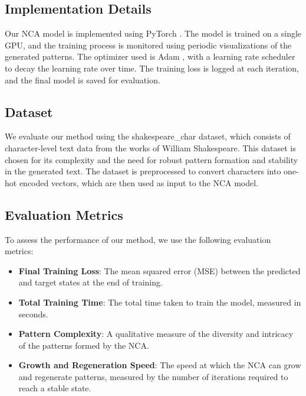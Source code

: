 \documentclass{article} %
\begin{document}
\subsection{Implementation Details}
Our NCA model is implemented using PyTorch \citep{paszke2019pytorch}. The model is trained on a single GPU, and the training process is monitored using periodic visualizations of the generated patterns. The optimizer used is Adam \citep{kingma2014adam}, with a learning rate scheduler to decay the learning rate over time. The training loss is logged at each iteration, and the final model is saved for evaluation.

\subsection{Dataset}
We evaluate our method using the shakespeare\_char dataset, which consists of character-level text data from the works of William Shakespeare. This dataset is chosen for its complexity and the need for robust pattern formation and stability in the generated text. The dataset is preprocessed to convert characters into one-hot encoded vectors, which are then used as input to the NCA model.

\subsection{Evaluation Metrics}
To assess the performance of our method, we use the following evaluation metrics:
\begin{itemize}
    \item \textbf{Final Training Loss}: The mean squared error (MSE) between the predicted and target states at the end of training.
    \item \textbf{Total Training Time}: The total time taken to train the model, measured in seconds.
    \item \textbf{Pattern Complexity}: A qualitative measure of the diversity and intricacy of the patterns formed by the NCA.
    \item \textbf{Growth and Regeneration Speed}: The speed at which the NCA can grow and regenerate patterns, measured by the number of iterations required to reach a stable state.
\end{itemize}

\end{document}
